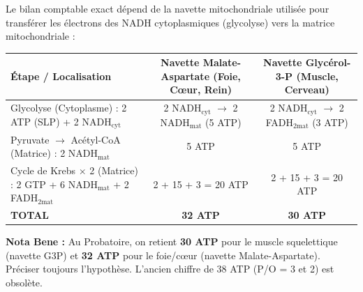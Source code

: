 \documentclass[11pt]{article}
\begin{document}
\begin{propriete}[Rendement ATP détaillé par glucose (P/O = 2,5 pour NADH ; 1,5 pour FADH2)]
    Le bilan comptable exact dépend de la navette mitochondriale utilisée pour transférer les électrons des NADH cytoplasmiques (glycolyse) vers la matrice mitochondriale :
    \begin{center}
        \begin{tabular}{|l|c|c|}\hline
        \textbf{Étape / Localisation} & \textbf{Navette Malate-Aspartate (Foie, Cœur, Rein)} & \textbf{Navette Glycérol-3-P (Muscle, Cerveau)} \\ \hline
        Glycolyse (Cytoplasme) : 2 ATP (SLP) + 2 NADH$_{\text{cyt}}$ & 2 NADH$_{\text{cyt}}$ $\to$ 2 NADH$_{\text{mat}}$ (5 ATP) & 2 NADH$_{\text{cyt}}$ $\to$ 2 FADH$_{2\text{mat}}$ (3 ATP) \\ \hline
        Pyruvate $\to$ Acétyl-CoA (Matrice) : 2 NADH$_{\text{mat}}$ & 5 ATP & 5 ATP \\ \hline
        Cycle de Krebs $\times$ 2 (Matrice) : 2 GTP + 6 NADH$_{\text{mat}}$ + 2 FADH$_{2\text{mat}}$ & 2 + 15 + 3 = 20 ATP & 2 + 15 + 3 = 20 ATP \\ \hline
        \textbf{TOTAL} & \textbf{32 ATP} & \textbf{30 ATP} \\ \hline
    \end{tabular}
    \end{center}
    \textbf{Nota Bene :} Au Probatoire, on retient \textbf{30 ATP} pour le muscle squelettique (navette G3P) et \textbf{32 ATP} pour le foie/cœur (navette Malate-Aspartate). Préciser toujours l'hypothèse. L'ancien chiffre de 38 ATP (P/O = 3 et 2) est obsolète.
\end{propriete}
\end{document}
